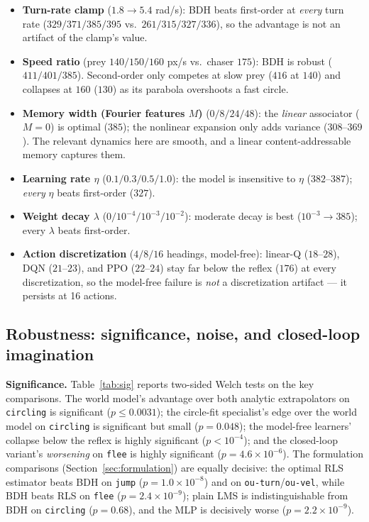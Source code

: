 \documentclass[11pt]{article}
\begin{document}
\begin{itemize}
\item \textbf{Turn-rate clamp} ($1.8 \to 5.4$ rad/s): BDH beats first-order at \emph{every}
  turn rate ($329/371/385/395$ vs.\ $261/315/327/336$), so the advantage is not an artifact of
  the clamp's value.
\item \textbf{Speed ratio} (prey $140/150/160$ px/s vs.\ chaser $175$): BDH is robust
  ($411/401/385$). Second-order only competes at slow prey ($416$ at $140$) and collapses at
  $160$ ($130$) as its parabola overshoots a fast circle.
\item \textbf{Memory width (Fourier features $M$)} ($0/8/24/48$): the \emph{linear} associator
  ($M=0$) is optimal ($385$); the nonlinear expansion only adds variance ($308$--$369$). The
  relevant dynamics here are smooth, and a linear content-addressable memory captures them.
\item \textbf{Learning rate $\eta$} ($0.1/0.3/0.5/1.0$): the model is insensitive to $\eta$
  ($382$--$387$); \emph{every} $\eta$ beats first-order ($327$).
\item \textbf{Weight decay $\lambda$} ($0/10^{-4}/10^{-3}/10^{-2}$): moderate decay is best
  ($10^{-3} \to 385$); every $\lambda$ beats first-order.
\item \textbf{Action discretization} ($4/8/16$ headings, model-free): linear-Q ($18$--$28$),
  DQN ($21$--$23$), and PPO ($22$--$24$) stay far below the reflex ($176$) at every
  discretization, so the model-free failure is \emph{not} a discretization artifact --- it
  persists at 16 actions.
\end{itemize}

\subsection{Robustness: significance, noise, and closed-loop imagination}\label{sec:robustness}

\textbf{Significance.} Table~\ref{tab:sig} reports two-sided Welch tests on the key
comparisons. The world model's advantage over both analytic extrapolators on \texttt{circling}
is significant ($p \le 0.0031$); the circle-fit specialist's edge over the world model on
\texttt{circling} is significant but small ($p = 0.048$); the model-free learners' collapse
below the reflex is highly significant ($p < 10^{-4}$); and the closed-loop variant's
\emph{worsening} on \texttt{flee} is highly significant ($p = 4.6 \times 10^{-6}$). The
formulation comparisons (Section~\ref{sec:formulation}) are equally decisive: the optimal RLS
estimator beats BDH on \texttt{jump} ($p = 1.0 \times 10^{-8}$) and on
\texttt{ou-turn}/\texttt{ou-vel}, while BDH beats RLS on \texttt{flee}
($p = 2.4 \times 10^{-9}$); plain LMS is indistinguishable from BDH on \texttt{circling}
($p = 0.68$), and the MLP is decisively worse ($p = 2.2 \times 10^{-9}$).
\end{document}
